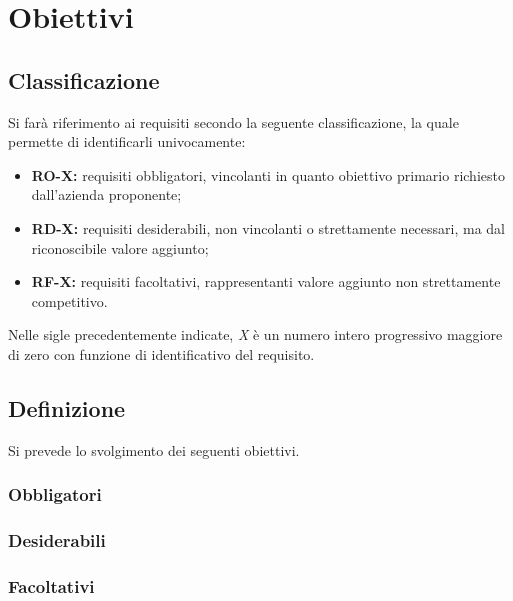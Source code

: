 
\section{Obiettivi}
	\subsection{Classificazione}
		Si farà riferimento ai requisiti secondo la seguente classificazione, la quale permette di identificarli univocamente:
		\begin{itemize}
			\item \textbf{RO-X:} requisiti obbligatori, vincolanti in quanto obiettivo primario richiesto dall'azienda proponente;
			\item \textbf{RD-X:} requisiti desiderabili, non vincolanti o strettamente necessari, ma dal riconoscibile valore aggiunto;
			\item \textbf{RF-X:} requisiti facoltativi, rappresentanti valore aggiunto non strettamente competitivo.
		\end{itemize}
		
		Nelle sigle precedentemente indicate, \textit{X} è un numero intero progressivo maggiore di zero con funzione di identificativo del requisito.
	
	\subsection{Definizione}
		Si prevede lo svolgimento dei seguenti obiettivi.

		\subsubsection*{Obbligatori}
		\begin{itemize}
			\obiettiviObbligatori
		\end{itemize}
		
		\subsubsection*{Desiderabili}
		\begin{itemize}
			\obiettiviDesiderabili
		\end{itemize}
		
		\subsubsection*{Facoltativi}
		\begin{itemize}
			\obiettiviFacoltativi
		\end{itemize} 

